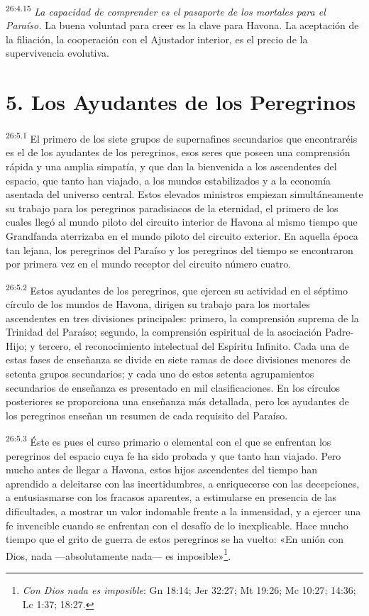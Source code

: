 \par
\textsuperscript{26:4.15} \textit{La capacidad de comprender es el pasaporte de los mortales para el Paraíso.} La buena voluntad para creer es la clave para Havona. La aceptación de la filiación, la cooperación con el Ajustador interior, es el precio de la supervivencia evolutiva.

\section*{5. Los Ayudantes de los Peregrinos}
\par
\textsuperscript{26:5.1} El primero de los siete grupos de supernafines secundarios que encontraréis es el de los ayudantes de los peregrinos, esos seres que poseen una comprensión rápida y una amplia simpatía, y que dan la bienvenida a los ascendentes del espacio, que tanto han viajado, a los mundos estabilizados y a la economía asentada del universo central. Estos elevados ministros empiezan simultáneamente su trabajo para los peregrinos paradisiacos de la eternidad, el primero de los cuales llegó al mundo piloto del circuito interior de Havona al mismo tiempo que Grandfanda aterrizaba en el mundo piloto del circuito exterior. En aquella época tan lejana, los peregrinos del Paraíso y los peregrinos del tiempo se encontraron por primera vez en el mundo receptor del circuito número cuatro.

\par
\textsuperscript{26:5.2} Estos ayudantes de los peregrinos, que ejercen su actividad en el séptimo círculo de los mundos de Havona, dirigen su trabajo para los mortales ascendentes en tres divisiones principales: primero, la comprensión suprema de la Trinidad del Paraíso; segundo, la comprensión espiritual de la asociación Padre-Hijo; y tercero, el reconocimiento intelectual del Espíritu Infinito. Cada una de estas fases de enseñanza se divide en siete ramas de doce divisiones menores de setenta grupos secundarios; y cada uno de estos setenta agrupamientos secundarios de enseñanza es presentado en mil clasificaciones. En los círculos posteriores se proporciona una enseñanza más detallada, pero los ayudantes de los peregrinos enseñan un resumen de cada requisito del Paraíso.

\par
\textsuperscript{26:5.3} Éste es pues el curso primario o elemental con el que se enfrentan los peregrinos del espacio cuya fe ha sido probada y que tanto han viajado. Pero mucho antes de llegar a Havona, estos hijos ascendentes del tiempo han aprendido a deleitarse con las incertidumbres, a enriquecerse con las decepciones, a entusiasmarse con los fracasos aparentes, a estimularse en presencia de las dificultades, a mostrar un valor indomable frente a la inmensidad, y a ejercer una fe invencible cuando se enfrentan con el desafío de lo inexplicable. Hace mucho tiempo que el grito de guerra de estos peregrinos se ha vuelto: «En unión con Dios, nada ---absolutamente nada--- es imposible»\footnote{\textit{Con Dios nada es imposible}: Gn 18:14; Jer 32:27; Mt 19:26; Mc 10:27; 14:36; Lc 1:37; 18:27.}.

